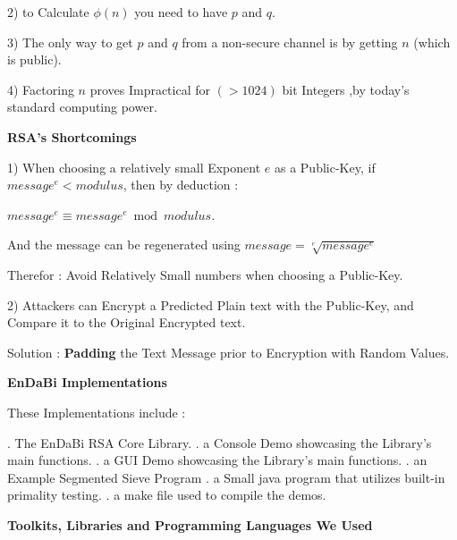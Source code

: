 \documentclass{slides}
\begin{document}
\begin{center}
2) to Calculate $ \phi(n) $ you  need to have $ p $ and $ q $.
\end{center}
\begin{center}
3) The only way to get $ p $ and $ q $ from a non-secure channel is by getting $ n $ (which is public).
\end{center}
\begin{center}
4) Factoring $ n $ proves Impractical for $ (>1024) $ bit Integers ,by today's standard computing power.
\end{center}
\newpage
\begin{center}
\textbf{\Large RSA's Shortcomings}
\end{center}
\begin{center}
1) When choosing a relatively small Exponent $ e $ as a Public-Key, if $ message^{e} < modulus $, then by deduction :

 $message^{e} \equiv message^{e} \bmod modulus $.

And the message can be regenerated using $ message = \sqrt[e]{message^{e}} $ 

Therefor : Avoid Relatively Small numbers when choosing a Public-Key.
\end{center}
\begin{center}
2) Attackers can Encrypt a Predicted Plain text with the Public-Key, and Compare it to the Original Encrypted text.

Solution : \textbf{Padding} the Text Message prior to Encryption with Random Values.
\end{center}
\newpage
\begin{center}
\textbf{\Large EnDaBi Implementations}
\end{center}
\begin{center}
These Implementations include :
\end{center}
\begin{center}
. The EnDaBi RSA Core Library.
\newline . a Console Demo showcasing the Library's main functions.
\newline . a GUI Demo showcasing the Library's main functions.
\newline  . an Example Segmented Sieve Program
\newline . a Small java program that utilizes built-in primality testing.
\newline . a make file used to compile the demos.
\end{center}
\newpage
\begin{center}
\textbf{\Large Toolkits, Libraries and Programming Languages We Used}
\end{center}
\end{document}
